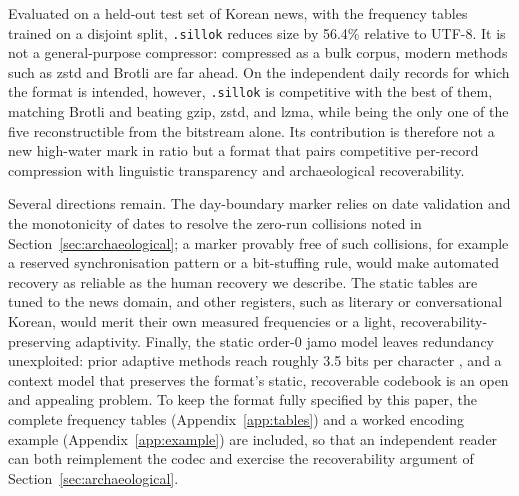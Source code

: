 \documentclass[conference]{IEEEtran}
\begin{document}
Evaluated on a held-out test set of Korean news, with the frequency tables
trained on a disjoint split, \texttt{.sillok} reduces size by 56.4\% relative to
UTF-8. It is not a general-purpose compressor: compressed as a bulk corpus,
modern methods such as zstd and Brotli are far ahead. On the independent daily
records for which the format is intended, however, \texttt{.sillok} is
competitive with the best of them, matching Brotli and beating gzip, zstd, and
lzma, while being the only one of the five reconstructible from the bitstream
alone. Its contribution is therefore not a new high-water mark in ratio but a
format that pairs competitive per-record compression with linguistic
transparency and archaeological recoverability.

Several directions remain. The day-boundary marker relies on date validation and
the monotonicity of dates to resolve the zero-run collisions noted in
Section~\ref{sec:archaeological}; a marker provably free of such collisions, for
example a reserved synchronisation pattern or a bit-stuffing rule, would make
automated recovery as reliable as the human recovery we describe. The static
tables are tuned to the news domain, and other registers, such as literary or
conversational Korean, would merit their own measured frequencies or a light,
recoverability-preserving adaptivity. Finally, the static order-0 jamo model
leaves redundancy unexploited: prior adaptive methods reach roughly 3.5 bits per
character \cite{phdcm}, and a context model that preserves the format's static,
recoverable codebook is an open and appealing problem. To keep the format fully
specified by this paper, the complete frequency tables (Appendix~\ref{app:tables})
and a worked encoding example (Appendix~\ref{app:example}) are included, so that
an independent reader can both reimplement the codec and exercise the
recoverability argument of Section~\ref{sec:archaeological}.
\end{document}
